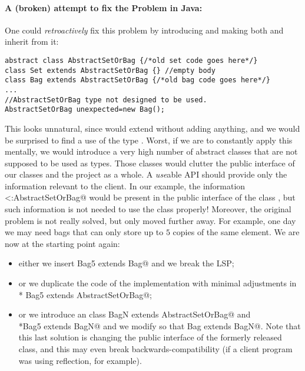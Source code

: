 \paragraph{A (broken) attempt to fix the Problem in Java:}
One could \emph{retroactively} fix this problem by introducing \Q@AbstractSetOrBag@
and making both \Q@Bag@ and \Q@Set@ inherit from it:

\begin{lstlisting}
abstract class AbstractSetOrBag {/*old set code goes here*/}
class Set extends AbstractSetOrBag {} //empty body
class Bag extends AbstractSetOrBag {/*old bag code goes here*/}
...
//AbstractSetOrBag type not designed to be used.
AbstractSetOrBag unexpected=new Bag(); 
\end{lstlisting}

This looks unnatural, since \Q@Set@ would extend \Q@AbstractSetOrBag@ without adding anything,
and we would be surprised to find a use of the type \Q@AbstractSetOrBag@.
Worst, if we are to constantly apply this mentally, we would introduce a very high number
of abstract classes that are not supposed to be used as types. Those classes would clutter the 
public interface of our classes and the project as a whole.
A \emph{use}able API should provide only the information relevant to the client.
In our example, the information \Q@Set<:AbstractSetOrBag@ would be present in the public interface
of the class \Q@Set@, but such information is not needed to use the class properly!
Moreover, the original problem is not really solved, but only moved 
further away. For example, one day  we may need bags that can only store up to $5$ copies of the same element.
We are now at the starting point again:
\begin{itemize}
\item either we insert \Q@class Bag5 extends Bag@ and we break the LSP; 
\item or we duplicate the code of the \Q@Bag@ implementation with minimal
  adjustments in \\* \Q@class Bag5 extends AbstractSetOrBag@;
\item or we introduce an
\Q@abstract class BagN extends AbstractSetOrBag@ and \\*\Q@class Bag5 extends BagN@
and we modify \Q@Bag@ so that  \Q@class Bag extends BagN@.
Note that this last solution is changing the public interface of the formerly released \Q@Bag@ class, and
this may even break backwards-compatibility (if a client program was using
reflection, for example).
\end{itemize}

